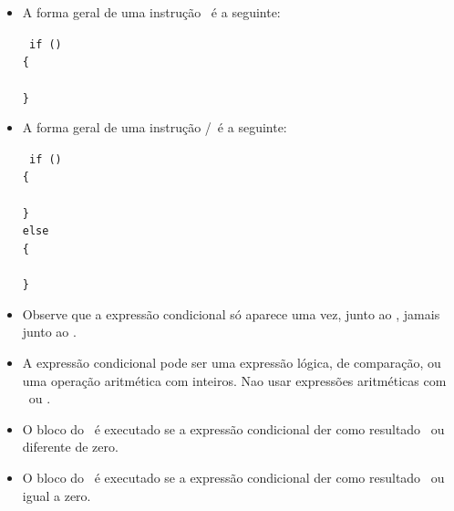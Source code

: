 \begin{itemize}

\item A forma geral de uma instrução \IF\ é a seguinte:

{\tt 
if ()             \\
\{                                                   \\
\TAB {}  \\
\}                                                   \\
}

\item A forma geral de uma instrução \IF/\ELSE\ é a seguinte:

{\tt 
if ()                         \\
\{                                                               \\
\TAB {}  \\
\}                                                               \\
else                                                             \\
\{                                                               \\
\TAB {}       \\
\}                                                               \\
}

\item Observe que a expressão condicional só aparece uma vez, junto ao \IF, jamais junto ao \ELSE.

\item A expressão condicional pode ser uma expressão lógica, de comparação, ou uma operação aritmética com inteiros. Nao usar expressões aritméticas com \FLOAT\ ou \DOUBLE.
\item O bloco do \IF\ é executado se a expressão condicional der como resultado \TRUE\ ou diferente de zero.
\item O bloco do \ELSE\ é executado se a expressão condicional der como resultado \FALSE\ ou igual a zero.

\end{itemize}


